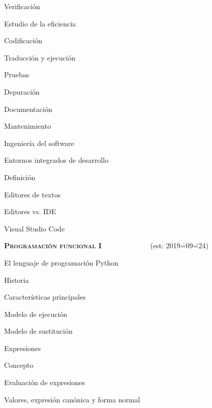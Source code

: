 \begin{longenum}
\begin{longenum}
\begin{longenum}
            \item Verificación
            \item Estudio de la eficiencia
            \item Codificación
            \item Traducción y ejecución
            \item Pruebas
            \item Depuración
            \item Documentación
            \item Mantenimiento
            \item Ingeniería del software
        \end{longenum}
        \item Entornos integrados de desarrollo
        \begin{longenum}
            \item Definición
            \item Editores de textos
            \item Editores vs. IDE
            \item Visual Studio Code
        \end{longenum}
    \end{longenum}
    \item \textbf{\textsc{Programación funcional I}} \ \ \ \ \ \ \ \ \ \ \ \ \ (est: 2019\==09\==24)
    \begin{longenum}
        \item El lenguaje de programación Python
        \begin{longenum}
            \item Historia
            \item Características principales
        \end{longenum}
        \item Modelo de ejecución
        \begin{longenum}
            \item Modelo de sustitución
        \end{longenum}
        \item Expresiones
        \begin{longenum}
            \item Concepto
            \item Evaluación de expresiones
            \begin{longenum}
                \item Valores, expresión canónica y forma normal

\end{longenum}
\end{longenum}
\end{longenum}
\end{longenum}
